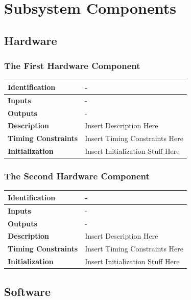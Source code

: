 \documentclass [10pt]{article}
\begin{document}


\section{Subsystem Components}

\subsection{Hardware}

\subsubsection{The First Hardware Component}
\begin{longtable}{| p{ } | p{ } | }\hline 
\textbf{Identification} & - \\ \hline
\textbf{Inputs} & - \\ \hline
\textbf{Outputs} & - \\ \hline
\textbf{Description} & Insert Description Here\\ \hline 
\textbf{Timing Constraints} & Insert Timing Constraints Here\\ \hline 
\textbf{Initialization} & Insert Initialization Stuff Here\\ \hline 
\end{longtable}

\subsubsection{The Second Hardware Component}
\begin{longtable}{| p{ } | p{ } | }\hline 
\textbf{Identification} & - \\ \hline
\textbf{Inputs} & - \\ \hline
\textbf{Outputs} & - \\ \hline
\textbf{Description} & Insert Description Here\\ \hline 
\textbf{Timing Constraints} & Insert Timing Constraints Here\\ \hline 
\textbf{Initialization} & Insert Initialization Stuff Here\\ \hline 
\end{longtable}

\subsection{Software}
\end{document}
